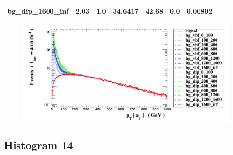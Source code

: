 \documentclass[a4paper, 10pt]{article}
\begin{document}
\begin{table}[H]
\begin{center}
\begin{tabular}{|m{23.0mm}|m{23.0mm}|m{18.0mm}|m{19.0mm}|m{19.0mm}|m{19.0mm}|m{19.0mm}|}
      \hline
      {\cellcolor{white}         bg\_dip\_1600\_inf}& {\cellcolor{white}         2.03}& {\cellcolor{white}         1.0}& {\cellcolor{white}         34.6417}& {\cellcolor{white}         42.68}& {\cellcolor{green}         0.0}& {\cellcolor{green}         0.00892}\\
\hline
    \end{tabular}
  \end{center}
\end{table}

\begin{figure}[H]
  \begin{center}
    \includegraphics[scale=0.45]{selection_12.png}\\
\caption{   }
  \end{center}
\end{figure}
      \newpage
\subsection{ Histogram 14}
\end{document}
